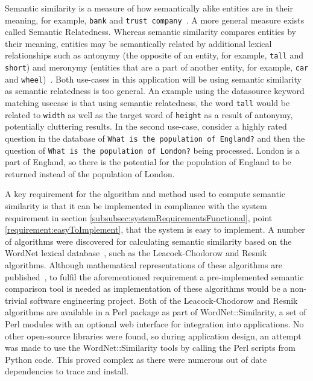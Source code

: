 \documentclass[authoryearcitations]{UoYCSproject}
\begin{document}
Semantic similarity is a measure of how semantically alike entities are in their meaning, for example, \texttt{bank} and \texttt{trust company}~\cite{Budanitsky:2006:EWM:1168106.1168108}. A more general measure exists called Semantic Relatedness. Whereas semantic similarity compares entities by their meaning, entities may be semantically related by additional lexical relationships such as antonymy (the opposite of an entity, for example, \texttt{tall} and \texttt{short}) and meronymy (entities that are a part of another entity, for example, \texttt{car} and \texttt{wheel})~\cite{Budanitsky:2006:EWM:1168106.1168108, budanitsky2001semantic}. Both use-cases in this application will be using semantic similarity as semantic relatedness is too general. An example using the datasource keyword matching usecase is that using semantic relatedness, the word \texttt{tall} would be related to \texttt{width} as well as the target word of \texttt{height} as a result of antonymy, potentially cluttering results. In the second use-case, consider a highly rated question in the database of \texttt{What is the population of England?} and then the question of \texttt{What is the population of London?} being processed. London is a part of England, so there is the potential for the population of England to be returned instead of the population of London.

A key requirement for the algorithm and method used to compute semantic similarity is that it can be implemented in compliance with the system requirement in section \ref{subsubsec:systemRequirementsFunctional}, point \ref{requirement:easyToImplement}, that the system is easy to implement. A number of algorithms were discovered for calculating semantic similarity based on the WordNet lexical database~\cite{wordNet}, such as the Leacock-Chodorow and Resnik algorithms. Although mathematical representations of these algorithms are published~\cite{leacock1998combining,resnik1995using}, to fulfil the aforementioned requirement a pre-implemented semantic comparison tool is needed as implementation of these algorithms would be a non-trivial software engineering project. Both of the Leacock-Chodorow and Resnik algorithms are available in a Perl package as part of WordNet::Similarity, a set of Perl modules with an optional web interface for integration into applications. No other open-source libraries were found, so during application design, an attempt was made to use the WordNet::Similarity tools by calling the Perl scripts from Python code. This proved complex as there were numerous out of date dependencies to trace and install.
\end{document}
